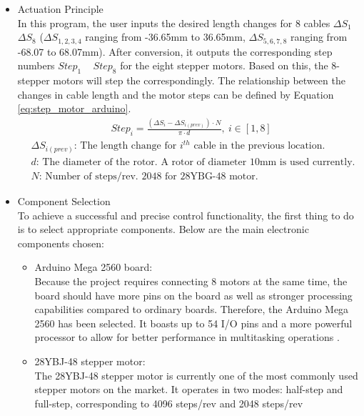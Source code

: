 \begin{itemize}
    \item Actuation Principle\\
    In this program, the user inputs the desired length changes for 8 cables $\Delta S_1$ ~ $\Delta S_8$ 
    ($\Delta S_{1,2,3,4}$ ranging from -36.65mm to 36.65mm, $\Delta S_{5,6,7,8}$ ranging from -68.07 to 68.07mm). 
    After conversion, it outputs the corresponding step numbers $Step_1$ ~ $Step_8$ for the eight stepper motors. 
    Based on this, the 8-stepper motors will step the correspondingly. The relationship between the changes in 
    cable length and the motor steps can be defined by Equation \ref{eq:step_motor_arduino}. \\
    \begin{align}
        & \qquad\qquad\qquad\qquad Step_i=\frac{(\Delta S_i-\Delta S_{i(prev)})\cdot N}{\pi\cdot d}, \ i\in[1,8] 
        \label{eq:step_motor_arduino} \\
        &\Delta S_{i(prev)} \text{: The length change for $i^{th}$ cable in the previous location.} \nonumber \\
        &d\text{: The diameter of the rotor. A rotor of diameter 10mm is used currently.} \nonumber \\
        &N\text{: Number of steps/rev. 2048 for 28YBG-48 motor.}\nonumber 
    \end{align}
    \item Component Selection \\
    To achieve a successful and precise control functionality, the first thing to do is to select appropriate 
    components. Below are the main electronic components chosen:
    \begin{itemize}
        \item Arduino Mega 2560 board: \\
        Because the project requires connecting 8 motors at the same time, the board should have more pins on the 
        board as well as stronger processing capabilities compared to ordinary boards. Therefore, the Arduino Mega 
        2560 has been selected. It boasts up to 54 I/O pins and a more powerful processor to allow for better 
        performance in multitasking operations \cite{arduino_guide}.
        \item 28YBJ-48 stepper motor: \\
        The 28YBJ-48 stepper motor is currently one of the most commonly used stepper motors on the market. It 
        operates in two modes: half-step and full-step, corresponding to 4096 steps/rev and 2048 steps/rev 

\end{itemize}
\end{itemize}
